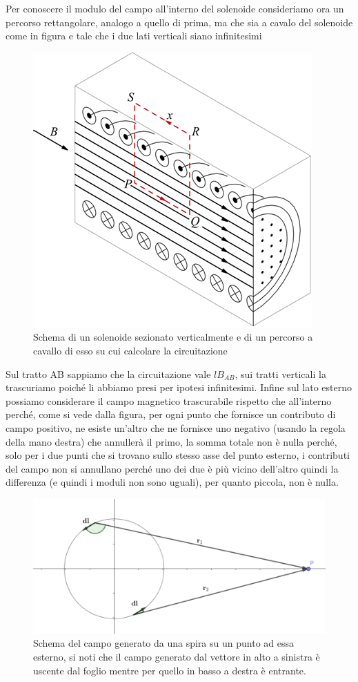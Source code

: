 \documentclass[
10pt, %
a4paper, %
oneside, %
headinclude,footinclude, %
BCOR5mm, %
]{scrartcl}
\begin{document}
Per conoscere il modulo del campo all'interno del solenoide consideriamo ora un percorso rettangolare, analogo a quello di prima, ma che sia a cavalo del solenoide come in figura e tale che i due lati verticali siano infinitesimi
\begin{figure}[h!]
	\centering
	\includegraphics[width=0.6\linewidth]{images/circuitazione_solenoide}
	\caption{Schema di un solenoide sezionato verticalmente e di un percorso a cavallo di esso su cui calcolare la circuitazione}
	\label{fig:circuitazionesolenoide}
\end{figure}
\FloatBarrier
Sul tratto AB sappiamo che la circuitazione vale \(lB_{AB}\), sui tratti verticali la trascuriamo poiché li abbiamo presi per ipotesi infinitesimi. Infine sul lato esterno possiamo considerare il campo magnetico trascurabile rispetto che all'interno perché, come si vede dalla figura, per ogni punto che fornisce un contributo di campo positivo, ne esiste un'altro che ne fornisce uno negativo (usando la regola della mano destra) che annullerà il primo, la somma totale non è nulla perché, solo per i due punti che si trovano sullo stesso asse del punto esterno, i contributi del campo non si annullano perché uno dei due è più vicino dell'altro quindi la differenza (e quindi i moduli non sono uguali), per quanto piccola, non è nulla. 
\begin{figure}[h!]
	\centering
	\includegraphics[width=0.7\linewidth]{images/campo_esterno_spira}
	\caption{Schema del campo generato da una spira su un punto ad essa esterno, si noti che il campo generato dal vettore in alto a sinistra è uscente dal foglio mentre per quello in basso a destra è entrante.}
	\label{fig:campoesternospira}
\end{figure}
\end{document}
